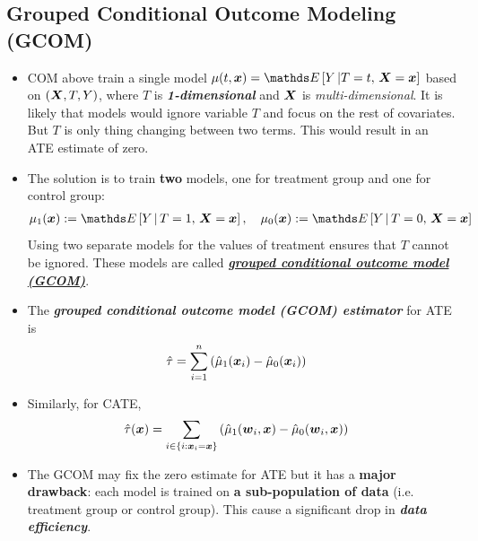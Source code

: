 \documentclass[11pt]{article}
\begin{document}
\subsection{Grouped Conditional Outcome Modeling (GCOM)}
\begin{itemize}
\item COM above train a single model $\mu(t, \mb{x}) = \E{}{Y \,|T=t,\,\mb{X} = \mb{x} }$ based on $(\boldsymbol{X}, T, Y)$, where $T$ is \emph{\textbf{1-dimensional}} and $\boldsymbol{X}$ is \emph{multi-dimensional}. It is likely that models would ignore variable $T$ and focus on the rest of covariates.  But $T$ is only thing changing between two terms. This would result in an ATE estimate of zero.

\item The solution is to train \textbf{two} models, one for treatment group and one for control group: 
\begin{align}
\mu_1(\mb{x}):= \E{}{Y\,|\,T=1, \, \mb{X}=\mb{x}},\quad  \mu_0(\mb{x}):= \E{}{Y\,|\,T=0, \, \mb{X}=\mb{x}}  \label{eqn: grouped_cond_outcome}
\end{align} Using two separate models for the values of treatment ensures that $T$ cannot be ignored. These models are called \underline{\emph{\textbf{grouped conditional
outcome model (GCOM)}}}. 

\item The \emph{\textbf{grouped conditional outcome model (GCOM) estimator}} for ATE is
\begin{align}
\hat{\tau} &= \sum_{i=1}^{n}\left(\hat{\mu}_1(\boldsymbol{x}_i) - \hat{\mu}_0(\boldsymbol{x}_i)\right) \label{eqn: grouped_cond_outcome_est_ate}
\end{align}

\item Similarly, for CATE, 
\begin{align}
\hat{\tau}(\boldsymbol{x}) &= \sum_{i \in \left\{i: \boldsymbol{x}_i = \boldsymbol{x}\right\}}\left(\hat{\mu}_1(\boldsymbol{w}_i,  \boldsymbol{x}) - \hat{\mu}_0(\boldsymbol{w}_i,  \boldsymbol{x})\right) \label{eqn: grouped_cond_outcome_est_cate}
\end{align}

\item The GCOM may fix the zero estimate for ATE but it has a \textbf{major drawback}: each model is trained on \textbf{a sub-population of data} (i.e. treatment group or control group). This cause a significant drop in \textbf{\emph{data efficiency}}.

\end{itemize}
\end{document}
